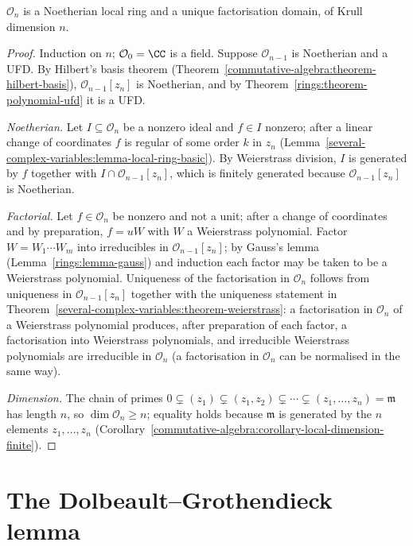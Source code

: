 \begin{theorem}\label{several-complex-variables:theorem-local-ring}
$\mathcal{O}_n$ is a Noetherian local ring and a unique factorisation domain, of Krull dimension $n$.
\end{theorem}

\begin{proof}
Induction on $n$; $\mathcal{O}_0 = \CC$ is a field. Suppose $\mathcal{O}_{n-1}$ is Noetherian and a UFD. By Hilbert's basis theorem (Theorem~\ref{commutative-algebra:theorem-hilbert-basis}),
$\mathcal{O}_{n-1}[z_n]$ is Noetherian, and by Theorem~\ref{rings:theorem-polynomial-ufd} it is a UFD.

\emph{Noetherian.} Let $I \subseteq \mathcal{O}_n$ be a nonzero ideal and $f \in I$ nonzero; after a linear change of coordinates $f$ is regular of some order $k$ in $z_n$
(Lemma~\ref{several-complex-variables:lemma-local-ring-basic}). By Weierstrass division, $I$ is generated by $f$ together with $I \cap \mathcal{O}_{n-1}[z_n]$, which is finitely generated because
$\mathcal{O}_{n-1}[z_n]$ is Noetherian.

\emph{Factorial.} Let $f \in \mathcal{O}_n$ be nonzero and not a unit; after a change of coordinates and by preparation, $f = uW$ with $W$ a Weierstrass polynomial. Factor $W = W_1 \cdots W_m$ into
irreducibles in $\mathcal{O}_{n-1}[z_n]$; by Gauss's lemma (Lemma~\ref{rings:lemma-gauss}) and induction each factor may be taken to be a Weierstrass polynomial. Uniqueness of the factorisation in
$\mathcal{O}_n$ follows from uniqueness in $\mathcal{O}_{n-1}[z_n]$ together with the uniqueness statement in Theorem~\ref{several-complex-variables:theorem-weierstrass}: a factorisation in
$\mathcal{O}_n$ of a Weierstrass polynomial produces, after preparation of each factor, a factorisation into Weierstrass polynomials, and irreducible Weierstrass polynomials are irreducible in
$\mathcal{O}_n$ (a factorisation in $\mathcal{O}_n$ can be normalised in the same way).

\emph{Dimension.} The chain of primes $0 \subsetneq (z_1) \subsetneq (z_1, z_2) \subsetneq \cdots \subsetneq (z_1, \ldots, z_n) = \mathfrak{m}$ has length $n$, so $\dim\mathcal{O}_n \geq n$; equality holds because
$\mathfrak{m}$ is generated by the $n$ elements $z_1, \ldots, z_n$ (Corollary~\ref{commutative-algebra:corollary-local-dimension-finite}).
\end{proof}

\section{The Dolbeault--Grothendieck lemma}\label{several-complex-variables:section-dbar}

